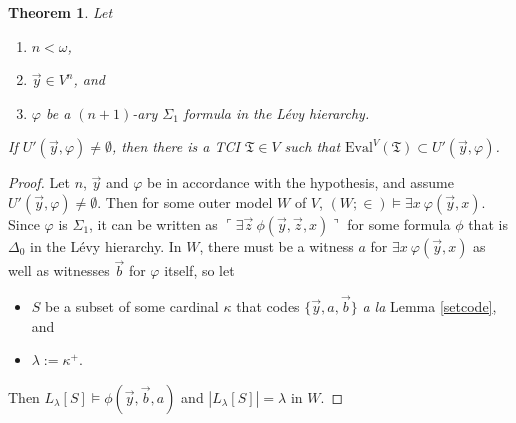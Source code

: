 \documentclass[12pt, twoside]{memoir}
\numberwithin{equation}{section}
\newtheorem{thm}{Theorem}[section]
\theoremstyle{definition}
\theoremstyle{remark}
\theoremstyle{definition}
\theoremstyle{definition}
\theoremstyle{definition}
\theoremstyle{remark}
\begin{document}
\begin{thm}\label{thm9419}
Let 
\begin{enumerate}[label=(\alph*)]
    \item $n < \omega$,
    \item $\Vec{y} \in V^n$, and
    \item $\varphi$ be a $(n + 1)$-ary $\Sigma_1$ formula in the L\'{e}vy hierarchy.
\end{enumerate}
If $U'(\Vec{y}, \varphi) \neq \emptyset$, then there is a TCI $\mathfrak{T} \in V$ such that $\mathrm{Eval}^V(\mathfrak{T}) \subset U'(\Vec{y}, \varphi)$. 
\end{thm}

\begin{proof}
Let $n$, $\Vec{y}$ and $\varphi$ be in accordance with the hypothesis, and assume $U'(\Vec{y}, \varphi) \neq \emptyset$. Then for some outer model $W$ of $V$, $(W; \in) \models \exists x \ \varphi (\Vec{y}, x)$. Since $\varphi$ is $\Sigma_1$, it can be written as $\ulcorner \exists \Vec{z} \ \phi(\Vec{y}, \Vec{z}, x) \urcorner$ for some formula $\phi$ that is $\Delta_0$ in the L\'{e}vy hierarchy. In $W$, there must be a witness $a$ for $\exists x \ \varphi (\Vec{y}, x)$ as well as witnesses $\Vec{b}$ for $\varphi$ itself, so let 
\begin{itemize}
    \item $S$ be a subset of some cardinal $\kappa$ that codes $\{\Vec{y}, a, \Vec{b}\}$ \textit{a la} Lemma \ref{setcode}, and
    \item $\lambda := \kappa^+$.
\end{itemize}
Then $L_{\lambda}[S] \models \phi(\Vec{y}, \Vec{b}, a)$ and $|L_{\lambda}[S]| = \lambda$ in $W$. 


\end{proof}
\end{document}
